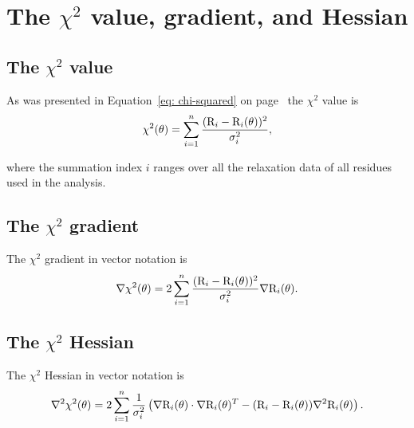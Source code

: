 
\section{The $\chi^2$ value, gradient, and Hessian}

\subsection{The $\chi^2$ value}

As was presented in Equation~\eqref{eq: chi-squared} on page~\pageref{eq: chi-squared} the $\chi^2$ value is
\begin{equation} \label{eq: maths: chi-squared}
 \chi^2(\theta) = \sum_{i=1}^n \frac{(\mathrm{R}_i - \mathrm{R}_i(\theta))^2}{\sigma_i^2},
\end{equation}

\noindent where the summation index $i$ ranges over all the relaxation data of all residues used in the analysis.



\subsection{The $\chi^2$ gradient}

The $\chi^2$ gradient in vector notation is
\begin{equation}
 \nabla \chi^2(\theta) = 2 \sum_{i=1}^n \frac{(\mathrm{R}_i - \mathrm{R}_i(\theta))^2}{\sigma_i^2} \nabla \mathrm{R}_i(\theta).
\end{equation}



\subsection{The $\chi^2$ Hessian}

The $\chi^2$ Hessian in vector notation is
\begin{equation}
 \nabla^2 \chi^2(\theta) = 2 \sum_{i=1}^n \frac{1}{\sigma_i^2} \left(\nabla \mathrm{R}_i(\theta) \cdot \nabla \mathrm{R}_i(\theta)^T - (\mathrm{R}_i - \mathrm{R}_i(\theta)) \nabla^2 \mathrm{R}_i(\theta) \right).
\end{equation}




